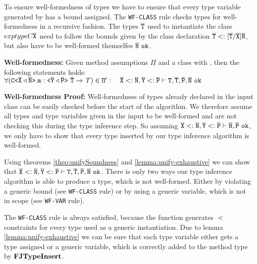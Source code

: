 \documentclass[a4paper,USenglish,cleveref, autoref, thm-restate, anonymous]{lipics-v2021}
\begin{document}
To ensure well-formedness of types we have to ensure that every type variable generated by \fjtype{} has a bound assigned.
The \texttt{WF-CLASS} rule checks types for well-formedness in a recursive fashion.
The types $\overline{\tt T}$ used to instantiate the class $exptype{C}{\overline{\tt X}}$ need to follow the bounds given by the class declaration $\overline{\tt T} <: [\overline{\tt T}/\overline{\tt X}]\overline{\tt N}$, but also have to be well-formed themselfes $\overline{\tt N}\ \texttt{ok}$.
\begin{lemma} \textbf{Well-formedness:}
  Given method assumptions $\Pi$ and a class  with
  ,
  then the following statements holds:\\
  \normalfont $\forall (\exptype{C}{\ol{X} \triangleleft \ol{N}}.\texttt{m} : \exptype{}{\ol{Y} \triangleleft \ol{P}}\ \ol{\type{T}} \to \itype{T}) \in \mv{\Pi}': \quad \ol{X} <: \ol{N}, \ol{Y} <: \ol{P} \vdash \type{T}, \ol{T}, \ol{P}, \ol{N}\ \texttt{ok}$
\end{lemma}
\textbf{Well-formedness Proof:}
Well-formedness of types already declared in the input class can be easily checked before the start of the \fjtype{} algorithm.
We therefore assume all types and type variables given in the input to be well-formed and are not checking this during the type inference step.
So assuming $\ol{X} <: \ol{N}, \ol{Y} <: \ol{P} \vdash \ol{N}, \ol{P}\ \texttt{ok}$, we only have to show that every type inserted by our type inference algorithm is well-formed.

Using theorems \ref{theo:unifySoundness} and \ref{lemma:unify-exhaustive} we can show that $\ol{X} <: \ol{N}, \ol{Y} <: \ol{P} \vdash \type{T}, \ol{T}, \ol{P}, \ol{N}\ \texttt{ok}$.
There is only two ways our type inference algorithm is able to produce a type, which is not well-formed.
Either by violating a generic bound (see \texttt{WF-CLASS} rule)
or by using a generic variable, which is not in scope (see \texttt{WF-VAR} rule).


The \texttt{WF-CLASS} rule is always satisfied, because the \fjtype function generates $\lessdot$ constraints for every type used as a generic instantiation.
Due to lemma \ref{lemma:unify-exhaustive} we can be sure that each type variable either gets a type assigned or a generic variable, which is correctly added to the method type by $\textbf{FJTypeInsert}$.
\fi
\end{document}

